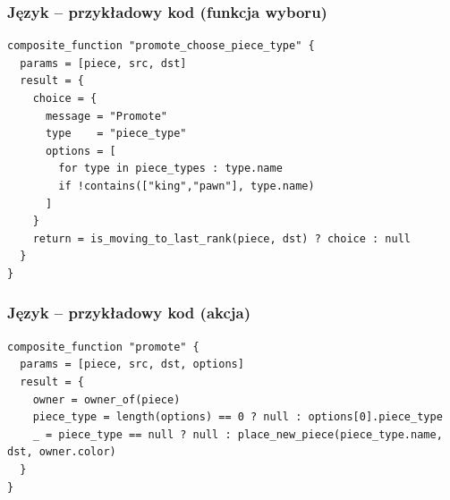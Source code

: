 \documentclass{beamer}
\begin{document}
\begin{frame}[fragile]
	\frametitle{Język -- przykładowy kod (funkcja wyboru)}
	\begin{lstlisting}
composite_function "promote_choose_piece_type" {
  params = [piece, src, dst]
  result = {
    choice = {
      message = "Promote"
      type    = "piece_type"
      options = [
        for type in piece_types : type.name
        if !contains(["king","pawn"], type.name)
      ]
    }
    return = is_moving_to_last_rank(piece, dst) ? choice : null
  }
}
	\end{lstlisting}
\end{frame}

\begin{frame}[fragile]
	\frametitle{Język -- przykładowy kod (akcja)}
	\begin{lstlisting}
composite_function "promote" {
  params = [piece, src, dst, options]
  result = {
    owner = owner_of(piece)
    piece_type = length(options) == 0 ? null : options[0].piece_type
    _ = piece_type == null ? null : place_new_piece(piece_type.name, dst, owner.color)
  }
}
	\end{lstlisting}
\end{frame}

\end{document}

